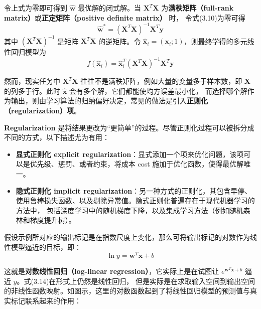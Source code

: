 \documentclass[../studies-ml.tex]{subfiles}
\begin{document}
\bigbreak

令上式为零即可得到 $\hat{\pmb{w}}$ 最优解的闭式解。当 $\pmb{X}^T\pmb{X}$ 为\textbf{满秩矩阵（full-rank matrix）}或\textbf{正定矩阵（positive definite matrix）} 时，
令式(3.10)为零可得
\begin{equation}
  \hat{\pmb{w}}^* = (\pmb{X}^T\pmb{X})^{-1}\pmb{X}^T\pmb{y}
\end{equation}
其中 $(\pmb{X}^T\pmb{X})^{-1}$ 是矩阵 $\pmb{X}^T\pmb{X}$ 的逆矩阵。令 $\hat{\pmb{x}}_i = (\pmb{x}_i;1)$，则最终学得的多元线性回归模型为
\begin{equation}
  f(\hat{\pmb{x}}_i) = \hat{\pmb{x}}_i^T (\pmb{X}^T\pmb{X})^{-1} \pmb{X}^T \pmb{y}
\end{equation}

然而，现实任务中 $\pmb{X}^T\pmb{X}$ 往往不是满秩矩阵，例如大量的变量多于样本数，即 $\pmb{X}$ 的列多于行。此时 $\hat{\pmb{x}}$ 会有多个解，它们都能使均方误差最小化，
而选择哪个解作为输出，则由学习算法的归纳偏好决定，常见的做法是引入\textbf{正则化（regularization）项}。

\bigbreak

\begin{anote}
  \textbf{Regularization} 是将结果更改为“更简单”的过程。尽管正则化过程可以被拆分成不同的方式，以下描述尤为有用：
  \begin{itemize}
    \item \textbf{显式正则化 explicit regularization}：显式添加一个项来优化问题，该项可以是优先级、惩罚、或者约束，将成本 cost 施加于优化函数，使得最优解唯一。
    \item \textbf{隐式正则化 implicit regularization}：另一种方式的正则化，其包含早停、使用鲁棒损失函数、以及剔除异常值。隐式正则化普遍存在于现代机器学习的方法中，
          包括深度学习中的随机梯度下降，以及集成学习方法（例如随机森林和梯度提升树）。
  \end{itemize}
\end{anote}

假设示例所对应的输出标记是在指数尺度上变化，那么可将输出标记的对数作为线性模型逼近的目标，即：
\begin{equation}
  \ln y = \pmb{w}^T\pmb{x} + b
\end{equation}

这就是\textbf{对数线性回归（log-linear regression）}，它实际上是在试图让 $e^{\pmb{w}^T\pmb{x}+b}$ 逼近 $y$。式(3.14)在形式上仍然是线性回归，
但是实际是在求取输入空间到输出空间的非线性函数映射。如图示，这里的对数函数起到了将线性回归模型的预测值与真实标记联系起来的作用：
\end{document}
